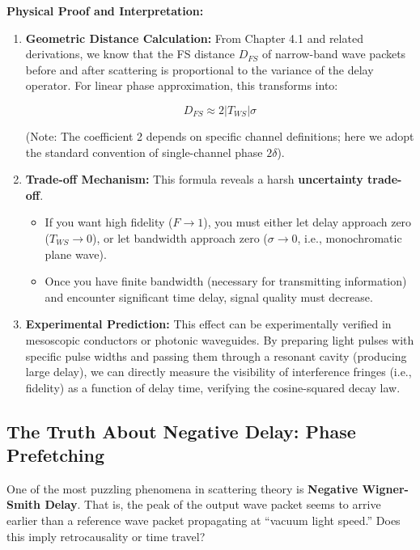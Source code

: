 \textbf{Physical Proof and Interpretation:}

\begin{enumerate}
\item \textbf{Geometric Distance Calculation:} From Chapter 4.1 and related derivations, we know that the FS distance $D_{FS}$ of narrow-band wave packets before and after scattering is proportional to the variance of the delay operator. For linear phase approximation, this transforms into:

   $$D_{FS} \approx 2 |T_{WS}| \sigma$$

   (Note: The coefficient 2 depends on specific channel definitions; here we adopt the standard convention of single-channel phase $2\delta$).

\item \textbf{Trade-off Mechanism:} This formula reveals a harsh \textbf{uncertainty trade-off}.

   \begin{itemize}
   \item If you want high fidelity ($F \to 1$), you must either let delay approach zero ($T_{WS} \to 0$), or let bandwidth approach zero ($\sigma \to 0$, i.e., monochromatic plane wave).

   \item Once you have finite bandwidth (necessary for transmitting information) and encounter significant time delay, signal quality must decrease.
   \end{itemize}

\item \textbf{Experimental Prediction:} This effect can be experimentally verified in mesoscopic conductors or photonic waveguides. By preparing light pulses with specific pulse widths and passing them through a resonant cavity (producing large delay), we can directly measure the visibility of interference fringes (i.e., fidelity) as a function of delay time, verifying the cosine-squared decay law.
\end{enumerate}

\subsection{The Truth About Negative Delay: Phase Prefetching}

One of the most puzzling phenomena in scattering theory is \textbf{Negative Wigner-Smith Delay}. That is, the peak of the output wave packet seems to arrive earlier than a reference wave packet propagating at ``vacuum light speed.'' Does this imply retrocausality or time travel?

